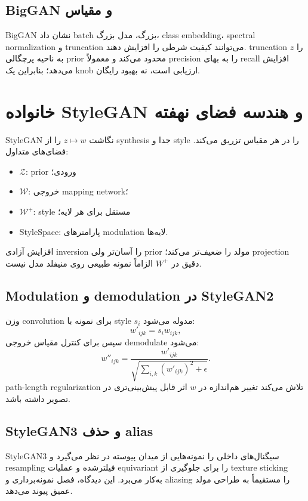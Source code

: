 \documentclass[12pt,openany,oneside]{book}
\begin{document}
\subsection{BigGAN و مقیاس}
BigGAN نشان داد batch بزرگ، مدل بزرگ، class embedding، spectral normalization و truncation می‌توانند کیفیت شرطی را افزایش دهند.
truncation $z$ را به ناحیه پرچگالی prior محدود می‌کند و معمولاً precision را به بهای recall افزایش می‌دهد؛ بنابراین یک knob ارزیابی است، نه بهبود رایگان.

\section{خانواده StyleGAN و هندسه فضای نهفته}
StyleGAN نگاشت $z\mapsto w$ را از synthesis جدا و style را در هر مقیاس تزریق می‌کند. فضای‌های متداول:
\begin{itemize}
\item $\mathcal Z$: prior ورودی؛
\item $\mathcal W$: خروجی mapping network؛
\item $\mathcal W^+$: style مستقل برای هر لایه؛
\item StyleSpace: پارامترهای modulation لایه‌ها.
\end{itemize}
افزایش آزادی inversion را آسان‌تر ولی prior مولد را ضعیف‌تر می‌کند؛ projection دقیق در $W^+$ الزاماً نمونه طبیعی روی منیفلد مدل نیست.

\subsection{Modulation و demodulation در StyleGAN2}
وزن convolution برای نمونه با style $s_i$ مدوله می‌شود:
\begin{equation}
 w'_{ijk}=s_iw_{ijk},
\end{equation}
سپس برای کنترل مقیاس خروجی demodulate می‌شود:
\begin{equation}
 w''_{ijk}=\frac{w'_{ijk}}{\sqrt{\sum_{i,k}(w'_{ijk})^2+\epsilon}}.
\end{equation}
path-length regularization تلاش می‌کند تغییر هم‌اندازه در $w$ اثر قابل پیش‌بینی‌تری در تصویر داشته باشد.

\subsection{StyleGAN3 و حذف alias}
StyleGAN3 سیگنال‌های داخلی را نمونه‌هایی از میدان پیوسته در نظر می‌گیرد و resampling فیلترشده و عملیات equivariant را برای جلوگیری از
texture sticking به‌کار می‌برد. این دیدگاه، فصل نمونه‌برداری و aliasing را مستقیماً به طراحی مولد عمیق پیوند می‌دهد.
\end{document}
